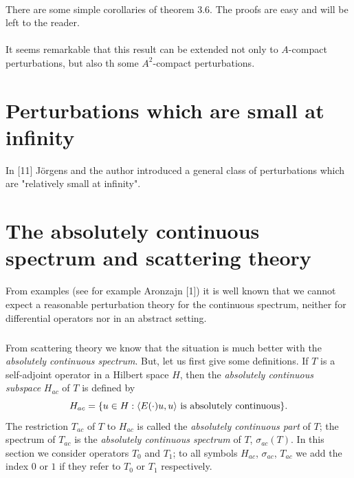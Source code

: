 \documentclass[11pt,twoside]{article}
\begin{document}

\paragraph*{}
There are some simple corollaries of theorem 3.6.
The proofs are easy and will be left to the reader.


\paragraph*{}
It seems remarkable that this result can be extended not only to $A$-compact
perturbations, but also th some $A^2$-compact perturbations.


\section{Perturbations which are small at infinity}                            %
In [11] J\"{o}rgens and the author introduced a general class of perturbations
which are "relatively small at infinity".


\section{The absolutely continuous spectrum and scattering theory}             %
From examples (see for example Aronzajn [1]) it is well known that
we cannot expect a reasonable perturbation theory for the continuous spectrum,
neither for differential operators nor in an abstract setting.

\subparagraph*{}
From scattering theory we know that the situation is much better
with the \textit{absolutely continuous spectrum}.
But, let us first give some definitions.
If $T$ is a self-adjoint operator in a Hilbert space $H$,
then the \textit{absolutely continuous subspace} $H_{ac}$ of $T$
is defined by
\[
H_{ac} = \{ u \in H: \langle E(\cdot)u,u \rangle \mbox{ is absolutely continuous}\}.
\]
The restriction $T_{ac}$ of $T$ to $H_{ac}$ is called the \textit{absolutely
continuous part} of $T$;
the spectrum of $T_{ac}$ is the \textit{absolutely continuous spectrum} of $T$,
$\sigma_{ac}(T)$.
In this section we consider operators $T_0$ and $T_1$;
to all symbols $H_{ac}$, $\sigma_{ac}$, $T_{ac}$ we add the index $0$ or $1$
if they refer to $T_0$ or $T_1$ respectively.
\end{document}
